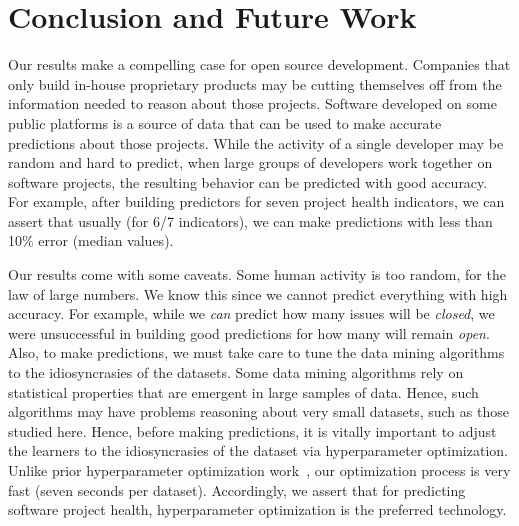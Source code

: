 \documentclass[sigconf,anonymous,review]{acmart}
\begin{document}
\section{Conclusion and Future Work}
\label{sect:concl}

 

Our results make a compelling case for open source development. Companies that only build in-house proprietary products may be cutting themselves off from the information needed to reason about those projects. Software developed on some public platforms is a source of data that can be used to
make accurate predictions  about those projects. While the activity of a single developer may be random and hard to predict, when large groups of developers work together on software projects,
the resulting behavior can be predicted with good accuracy. For example, after building predictors for seven project health indicators, we can assert that usually (for 6/7 indicators), we can make predictions with less than 10\% error (median values). 

Our results come with some caveats. Some human activity is  too random, for the law of large numbers. We know this since we cannot predict everything  
 with high accuracy. For example, 
 while we {\em can}  predict how many issues will be {\em closed}, we were   unsuccessful in building good predictions for     how many  will remain {\em open}. 
 Also, to make predictions, we must take care to tune the data mining algorithms to the idiosyncrasies of the datasets.
 Some data mining algorithms rely on statistical properties that are emergent in large samples of data.
 Hence, such algorithms may have problems reasoning about very small datasets, such as those studied here.
 Hence, before making predictions, it is vitally   important to adjust the learners to the idiosyncrasies of the dataset via hyperparameter optimization. Unlike prior hyperparameter optimization work~\cite{Fu2016TuningFS}, our optimization process is very fast (seven seconds per dataset). Accordingly, we assert that for predicting software project health, hyperparameter optimization is the preferred technology.
 
\end{document}
